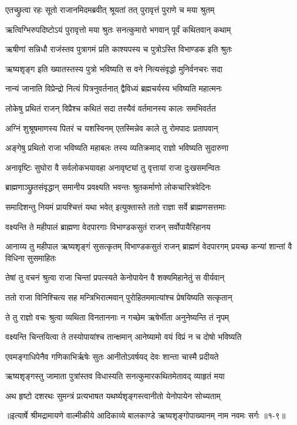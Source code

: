 
\twolineshloka
{एतच्छ्रुत्वा रहः सूतो राजानमिदमब्रवीत्}
{श्रूयतां तत् पुरावृत्तं पुराणे च मया श्रुतम्} %

\twolineshloka
{ऋत्विग्भिरुपदिष्टोऽयं पुरावृत्तो मया श्रुतः}
{सनत्कुमारो भगवान् पूर्वं कथितवान् कथाम्} %

\twolineshloka
{ऋषीणां सन्निधौ राजंस्तव पुत्रागमं प्रति}
{काश्यपस्य च पुत्रोऽस्ति विभाण्डक इति श्रुतः} %

\twolineshloka
{ऋष्यशृङ्ग इति ख्यातस्तस्य पुत्रो भविष्यति}
{स वने नित्यसंवृद्धो मुनिर्वनचरः सदा} %

\twolineshloka
{नान्यं जानाति विप्रेन्द्रो नित्यं पित्रनुवर्तनात्}
{द्वैविध्यं ब्रह्मचर्यस्य भविष्यति महात्मनः} %

\twolineshloka
{लोकेषु प्रथितं राजन् विप्रैश्च कथितं सदा}
{तस्यैवं वर्तमानस्य कालः समभिवर्तत} %

\twolineshloka
{अग्निं शुश्रूषमाणस्य पितरं च यशस्विनम्}
{एतस्मिन्नेव काले तु रोमपादः प्रतापवान्} %

\twolineshloka
{अङ्गेषु प्रथितो राजा भविष्यति महाबलः}
{तस्य व्यतिक्रमाद् राज्ञो भविष्यति सुदारुणा} %

\twolineshloka
{अनावृष्टिः सुघोरा वै सर्वलोकभयावहा}
{अनावृष्ट्यां तु वृत्तायां राजा दुःखसमन्वितः} %

\twolineshloka
{ब्राह्मणाञ्छ्रुतसंवृद्धान् समानीय प्रवक्ष्यति}
{भवन्तः श्रुतकर्माणो लोकचारित्रवेदिनः} %

\twolineshloka
{समादिशन्तु नियमं प्रायश्चित्तं यथा भवेत्}
{इत्युक्तास्ते ततो राज्ञा सर्वे ब्राह्मणसत्तमाः} %

\twolineshloka
{वक्ष्यन्ति ते महीपालं ब्राह्मणा वेदपारगाः}
{विभाण्डकसुतं राजन् सर्वोपायैरिहानय} %

\threelineshloka
{आनाय्य तु महीपाल ऋष्यशृङ्गं सुसत्कृतम्}
{विभाण्डकसुतं राजन् ब्राह्मणं वेदपारगम्}
{प्रयच्छ कन्यां शान्तां वै विधिना सुसमाहितः} %

\twolineshloka
{तेषां तु वचनं श्रुत्वा राजा चिन्तां प्रपत्स्यते}
{केनोपायेन वै शक्यमिहानेतुं स वीर्यवान्} %

\twolineshloka
{ततो राजा विनिश्चित्य सह मन्त्रिभिरात्मवान्}
{पुरोहितममात्यांश्च प्रेषयिष्यति सत्कृतान्} %

\twolineshloka
{ते तु राज्ञो वचः श्रुत्वा व्यथिता विनताननाः}
{न गच्छेम ऋषेर्भीता अनुनेष्यन्ति तं नृपम्} %

\twolineshloka
{वक्ष्यन्ति चिन्तयित्वा ते तस्योपायांश्च तान्क्षमान्}
{आनेष्यामो वयं विप्रं न च दोषो भविष्यति} %

\twolineshloka
{एवमङ्गाधिपेनैव गणिकाभिर्ऋषेः सुतः}
{आनीतोऽवर्षयद् देवः शान्ता चास्मै प्रदीयते} %

\twolineshloka
{ऋष्यशृङ्गस्तु जामाता पुत्रांस्तव विधास्यति}
{सनत्कुमारकथितमेतावद् व्याहृतं मया} %

\twolineshloka
{अथ हृष्टो दशरथः सुमन्त्रं प्रत्यभाषत}
{यथर्ष्यशृङ्गस्त्वानीतो येनोपायेन सोच्यताम्} %


॥इत्यार्षे श्रीमद्रामायणे वाल्मीकीये आदिकाव्ये बालकाण्डे ऋष्यशृङ्गोपाख्यानम् नाम नवमः सर्गः ॥१-९॥
